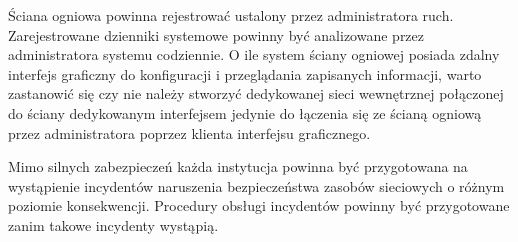 Ściana ogniowa powinna rejestrować ustalony przez administratora ruch.
Zarejestrowane dzienniki systemowe powinny być analizowane przez
administratora systemu codziennie. O ile system ściany ogniowej posiada
zdalny interfejs graficzny do konfiguracji i przeglądania zapisanych
informacji, warto zastanowić się czy nie należy stworzyć dedykowanej sieci
wewnętrznej połączonej do ściany dedykowanym interfejsem jedynie do łączenia
się ze ścianą ogniową przez administratora poprzez klienta interfejsu
graficznego.

Mimo silnych zabezpieczeń każda instytucja powinna być przygotowana na
wystąpienie incydentów naruszenia bezpieczeństwa zasobów sieciowych o różnym
poziomie konsekwencji. Procedury obsługi incydentów powinny być przygotowane
zanim takowe incydenty wystąpią.

